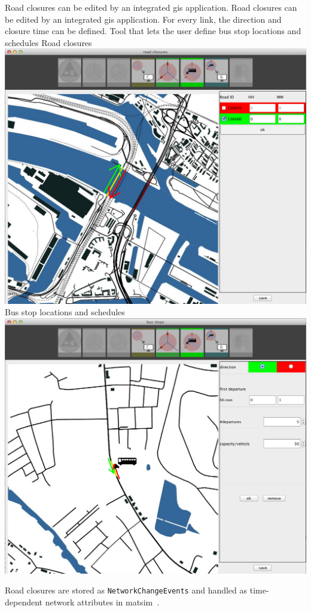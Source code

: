 \createfigure%
{Road closures can be edited by an integrated \protect\gls{gis} application.}%
{Road closures can be edited by an integrated \protect\gls{gis} application. For every link, the direction and closure time can be defined. Tool that lets the user define bus stop locations and schedules}%
{\label{fig:evac_editor}}%
{%
  \createsubfigure%
  {Road closures}%
{\includegraphics[width=.475\linewidth]{extending/figures/Evacuation/rd_closure_detail}}
  {}%
  {}%
  \createsubfigure%
  {Bus stop locations and schedules}%
{\includegraphics[width=.475\linewidth]{extending/figures/Evacuation/bus_stops}}
  {}%
  {}%
}%
  {}%

Road closures are stored as \lstinline|NetworkChangeEvents| and handled as time-dependent network attributes in \gls{matsim}~\citep{00LaemmelGretherNagel2009TimeDependentNetworks}.

